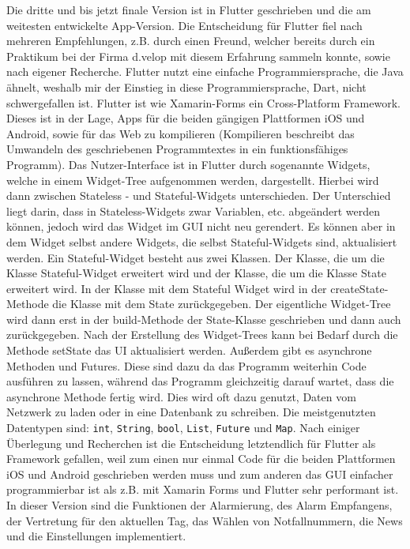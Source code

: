     Die dritte und bis jetzt finale Version ist in Flutter geschrieben und die am weitesten 
    entwickelte App-Version. Die Entscheidung für Flutter fiel nach mehreren Empfehlungen, 
    z.B. durch einen Freund, welcher bereits durch ein Praktikum bei der Firma d.velop mit 
    diesem Erfahrung sammeln konnte, sowie nach eigener Recherche. Flutter nutzt eine 
    einfache Programmiersprache, die Java ähnelt, weshalb mir der Einstieg in diese 
    Programmiersprache, Dart\cite{Dart}, nicht schwergefallen ist. Flutter ist wie Xamarin-Forms
    ein Cross-Platform Framework. Dieses ist in der Lage, Apps für die beiden gängigen 
    Plattformen iOS und Android, sowie für das Web zu kompilieren (Kompilieren beschreibt das Umwandeln
    des geschriebenen Programmtextes in ein funktionsfähiges Programm).
    Das Nutzer-Interface ist in Flutter durch sogenannte Widgets, welche in einem \glqq Widget-Tree\grqq{} 
    aufgenommen werden, dargestellt. Hierbei wird dann zwischen \glqq Stateless\grqq
    \cite{Stateless-Widget}- und \glqq Stateful\grqq\cite{Stateful-Widget}-Widgets unterschieden. 
    Der Unterschied liegt darin, dass in \glqq Stateless-Widgets\grqq{} zwar Variablen, etc. abgeändert 
    werden können, jedoch wird das Widget im GUI nicht neu gerendert. Es können aber in dem 
    Widget selbst andere Widgets, die selbst \glqq Stateful-Widgets\grqq{} sind, aktualisiert werden.
    Ein Stateful-Widget besteht aus zwei Klassen. Der Klasse, die um die Klasse 
    \glqq Stateful-Widget\grqq{} erweitert wird und der Klasse, die um die Klasse 
    \glqq State\grqq{}\cite{State} erweitert wird. In der Klasse mit dem Stateful Widget wird in der
    \glqq createState\grqq{}-Methode die Klasse mit dem State zurückgegeben. Der eigentliche Widget-Tree
    wird dann erst in der \glqq build-Methode\grqq{} der State-Klasse geschrieben und dann auch 
    zurückgegeben. Nach der Erstellung des Widget-Trees kann bei Bedarf durch die Methode 
    \glqq setState\grqq{} das UI aktualisiert werden. Außerdem gibt es asynchrone Methoden und 
    Futures\cite{Futures}. Diese sind dazu da das Programm weiterhin Code ausführen zu lassen,
    während das Programm gleichzeitig darauf wartet, dass die asynchrone Methode fertig wird. 
    Dies wird oft dazu genutzt, Daten vom Netzwerk zu laden oder in eine Datenbank zu 
    schreiben. Die meistgenutzten Datentypen sind: \texttt{int}, \texttt{String}, \texttt{bool}, \texttt{List}, 
    \texttt{Future} und \texttt{Map}.
    Nach einiger Überlegung und Recherchen ist die Entscheidung letztendlich für Flutter als 
    Framework gefallen, weil zum einen nur einmal Code für die beiden Plattformen iOS und 
    Android geschrieben werden muss und zum anderen das GUI einfacher programmierbar ist als 
    z.B. mit Xamarin Forms und Flutter sehr performant ist. In dieser Version sind die Funktionen
    der Alarmierung, des Alarm Empfangens, der Vertretung für den aktuellen Tag, das Wählen von 
    Notfallnummern, die News und die Einstellungen implementiert.